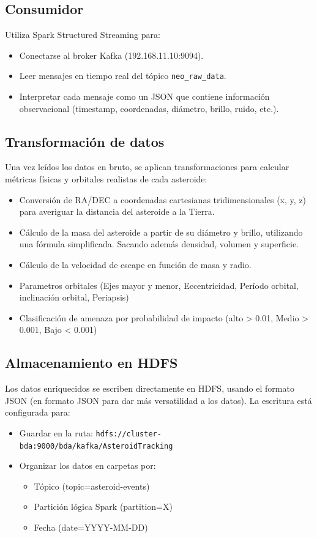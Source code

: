 \documentclass[12pt]{article}
\begin{document}
\subsection{Consumidor}
Utiliza Spark Structured Streaming para:

\begin{itemize}
  \item Conectarse al broker Kafka (192.168.11.10:9094).
  \item Leer mensajes en tiempo real del tópico \texttt{neo\_raw\_data}.
  \item Interpretar cada mensaje como un JSON que contiene información observacional 
        (timestamp, coordenadas, diámetro, brillo, ruido, etc.).
\end{itemize}

\subsection{Transformación de datos}
Una vez leídos los datos en bruto, se aplican transformaciones para calcular métricas físicas y orbitales realistas de cada asteroide:

\begin{itemize}
  \item Conversión de RA/DEC a coordenadas cartesianas tridimensionales (x, y, z) para averiguar la distancia del asteroide a la Tierra.
  \item Cálculo de la masa del asteroide a partir de su diámetro y brillo, utilizando una fórmula simplificada. Sacando además
  densidad, volumen y superficie.
  \item Cálculo de la velocidad de escape en función de masa y radio.
  \item Parametros orbitales (Ejes mayor y menor, Eccentricidad, Período orbital, inclinación orbital, Periapsis)
  \item Clasificación de amenaza por probabilidad de impacto (alto > 0.01, Medio > 0.001, Bajo < 0.001)
\end{itemize}

\subsection{Almacenamiento en HDFS}

Los datos enriquecidos se escriben directamente en HDFS, usando el formato JSON (en formato JSON para dar más versatilidad a
los datos). La escritura está configurada para:

\begin{itemize}
  \item Guardar en la ruta: \texttt{hdfs://cluster-bda:9000/bda/kafka/AsteroidTracking}
  \item Organizar los datos en carpetas por:
  \begin{itemize}
    \item Tópico (topic=asteroid-events)
    \item Partición lógica Spark (partition=X)
    \item Fecha (date=YYYY-MM-DD)
  \end{itemize}
\end{itemize}
\end{document}

